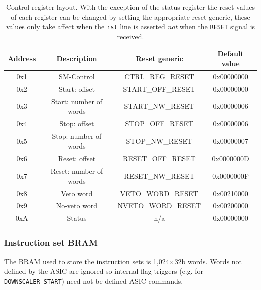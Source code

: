 \begin{table}[htbp]
  \begin{center}
    \begin{tabular}{c|c | c |c}
      Address & Description             & Reset generic      & Default value  \\
      \hline                    
      0x1     & SM-Control              & CTRL\_REG\_RESET   & 0x00000000     \\ 
      0x2     & Start: offset           & START\_OFF\_RESET  & 0x00000000     \\  
      0x3     & Start: number of words  & START\_NW\_RESET   & 0x00000006     \\ 
      0x4     & Stop: offset            & STOP\_OFF\_RESET   & 0x00000006     \\ 
      0x5     & Stop: number of words   & STOP\_NW\_RESET    & 0x00000007     \\ 
      0x6     & Reset: offset           & RESET\_OFF\_RESET  & 0x0000000D     \\ 
      0x7     & Reset: number of words  & RESET\_NW\_RESET   & 0x0000000F     \\ 
      0x8     & Veto word               & VETO\_WORD\_RESET  & 0x00210000     \\ 
      0x9     & No-veto word            & NVETO\_WORD\_RESET & 0x00200000     \\ 
      0xA     & Status                  & n/a                & 0x00000000     \\ 
    \end{tabular}
  \end{center}
  \caption{Control register layout. With the exception of the status register the reset values of each register can be changed by setting the appropriate reset-generic, these values only take affect when the \texttt{rst} line is asserted \emph{not} when the \texttt{RESET} signal is received.}
  \label{tab:ctrl_reg_default}
\end{table}

\subsubsection{Instruction set BRAM} %
\label{sub:tx_bram}
The BRAM used to store the instruction sets is 1,024\(\times\)32b words. Words not defined by the ASIC are ignored so internal flag triggers (e.g. for \texttt{DOWNSCALER\_START}) need not be defined ASIC commands.

